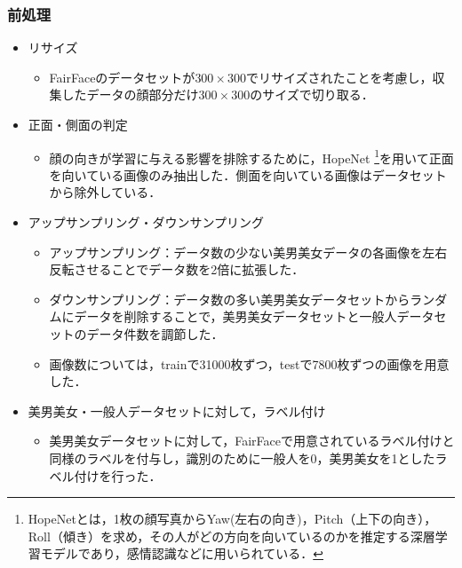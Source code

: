 \documentclass[a4paper,11pt,titlepage]{jsarticle}
\begin{document}
\subsubsection{前処理}
\begin{itemize}
    \item リサイズ
        \begin{itemize}
            \item FairFaceのデータセットが$300 \times 300$でリサイズされたことを考慮し，収集したデータの顔部分だけ$300 \times 300$のサイズで切り取る．
        \end{itemize}
    \item 正面・側面の判定
        \begin{itemize}
            \item 顔の向きが学習に与える影響を排除するために，HopeNet \footnote{ HopeNetとは，1枚の顔写真からYaw(左右の向き)，Pitch（上下の向き），Roll（傾き）を求め，その人がどの方向を向いているのかを推定する深層学習モデルであり，感情認識などに用いられている．\cite{hopenet_paper}\cite{hopenet} }を用いて正面を向いている画像のみ抽出した．側面を向いている画像はデータセットから除外している．
        \end{itemize}
    \item アップサンプリング・ダウンサンプリング
        \begin{itemize}
            \item アップサンプリング：データ数の少ない美男美女データの各画像を左右反転させることでデータ数を2倍に拡張した．
            \item ダウンサンプリング：データ数の多い美男美女データセットからランダムにデータを削除することで，美男美女データセットと一般人データセットのデータ件数を調節した．
            \item 画像数については，trainで31000枚ずつ，testで7800枚ずつの画像を用意した．
        \end{itemize}
    \item 美男美女・一般人データセットに対して，ラベル付け
    
        \begin{itemize}
            \item 美男美女データセットに対して，FairFaceで用意されているラベル付けと同様のラベルを付与し，識別のために一般人を0，美男美女を1としたラベル付けを行った．
        \end{itemize}
\end{itemize}
\end{document}
